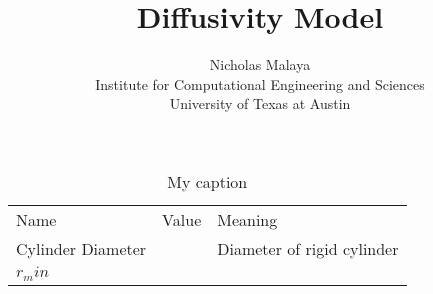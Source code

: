\documentclass{article}
\title{\bf{Diffusivity Model}}
\author{Nicholas Malaya \\ Institute for Computational Engineering and Sciences \\ University of Texas at Austin} \date{}
\begin{document}
\maketitle

\newpage

\begin{table}[]
\centering
\caption{My caption}
\label{my-label}
\begin{tabular}{lll}
Name              & Value & Meaning                    \\
Cylinder Diameter &       & Diameter of rigid cylinder \\
$r_min$            &       &                           
\end{tabular}
\end{table}
\end{document}
